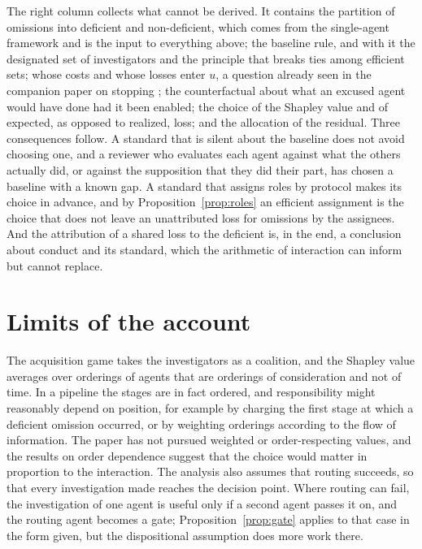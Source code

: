 \documentclass[11pt]{article}
\theoremstyle{plain}
\theoremstyle{definition}
\begin{document}
The right column collects what cannot be derived. It contains the partition of omissions into deficient and non-deficient, which comes from the single-agent framework and is the input to everything above; the baseline rule, and with it the designated set of investigators and the principle that breaks ties among efficient sets; whose costs and whose losses enter $u$, a question already seen in the companion paper on stopping \cite{flyxion2026stop}; the counterfactual about what an excused agent would have done had it been enabled; the choice of the Shapley value and of expected, as opposed to realized, loss; and the allocation of the residual. Three consequences follow. A standard that is silent about the baseline does not avoid choosing one, and a reviewer who evaluates each agent against what the others actually did, or against the supposition that they did their part, has chosen a baseline with a known gap. A standard that assigns roles by protocol makes its choice in advance, and by Proposition~\ref{prop:roles} an efficient assignment is the choice that does not leave an unattributed loss for omissions by the assignees. And the attribution of a shared loss to the deficient is, in the end, a conclusion about conduct and its standard, which the arithmetic of interaction can inform but cannot replace.

\section{Limits of the account}\label{sec:limits}

The acquisition game takes the investigators as a coalition, and the Shapley value averages over orderings of agents that are orderings of consideration and not of time. In a pipeline the stages are in fact ordered, and responsibility might reasonably depend on position, for example by charging the first stage at which a deficient omission occurred, or by weighting orderings according to the flow of information. The paper has not pursued weighted or order-respecting values, and the results on order dependence suggest that the choice would matter in proportion to the interaction. The analysis also assumes that routing succeeds, so that every investigation made reaches the decision point. Where routing can fail, the investigation of one agent is useful only if a second agent passes it on, and the routing agent becomes a gate; Proposition~\ref{prop:gate} applies to that case in the form given, but the dispositional assumption does more work there.
\end{document}
